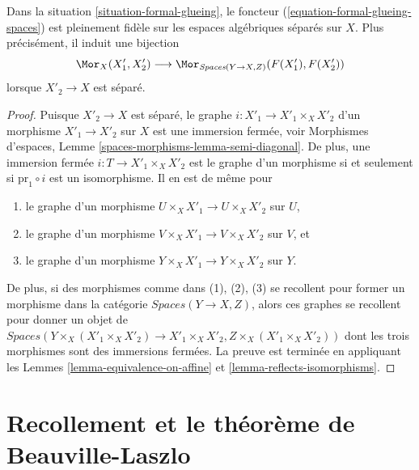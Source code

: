 \begin{lemma}
\label{lemma-fully-faithful-on-separated}
Dans la situation \ref{situation-formal-glueing}, le foncteur
(\ref{equation-formal-glueing-spaces}) est pleinement fidèle
sur les espaces algébriques séparés sur $X$. Plus précisément, il induit
une bijection
$$
\Mor_X(X'_1, X'_2)
\longrightarrow
\Mor_{\textit{Spaces}(Y \to X, Z)}(F(X'_1), F(X'_2))
$$
lorsque $X'_2 \to X$ est séparé.
\end{lemma}

\begin{proof}
Puisque $X'_2 \to X$ est séparé, le graphe $i : X'_1 \to X'_1 \times_X X'_2$
d'un morphisme $X'_1 \to X'_2$ sur $X$ est une immersion fermée, voir
Morphismes d'espaces, Lemme \ref{spaces-morphisms-lemma-semi-diagonal}.
De plus, une immersion fermée $i : T \to X'_1 \times_X X'_2$ est le graphe d'un
morphisme si et seulement si $\text{pr}_1 \circ i$ est un isomorphisme.
Il en est de même pour
\begin{enumerate}
\item le graphe d'un morphisme $U \times_X X'_1 \to U \times_X X'_2$ sur $U$,
\item le graphe d'un morphisme $V \times_X X'_1 \to V \times_X X'_2$ sur $V$,
et
\item le graphe d'un morphisme $Y \times_X X'_1 \to Y \times_X X'_2$ sur $Y$.
\end{enumerate}
De plus, si des morphismes comme dans (1), (2), (3) se recollent pour former un
morphisme dans la catégorie $\textit{Spaces}(Y \to X, Z)$, alors ces
graphes se recollent pour donner un objet de
$\textit{Spaces}(Y \times_X (X'_1 \times_X X'_2) \to X'_1 \times_X X'_2,
Z \times_X (X'_1 \times_X X'_2))$
dont les trois morphismes sont des immersions fermées. La preuve est terminée en appliquant les Lemmes \ref{lemma-equivalence-on-affine} et \ref{lemma-reflects-isomorphisms}. 
\end{proof}









\section{Recollement et le théorème de Beauville-Laszlo}
\label{section-glueing-beauville-laszlo}

